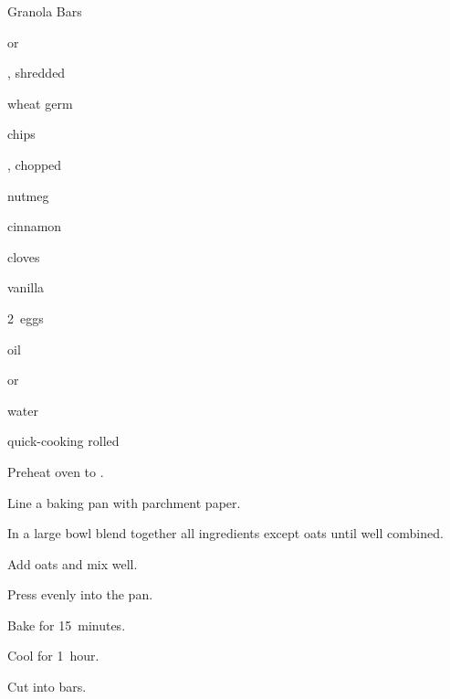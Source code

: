 \begin{recipe}{Granola Bars}{}{}

\begin{ingredients}
\item \C{\half}  or 
\item \C{\half} , shredded
\item \C{\quarter} wheat germ
\item \C{\quarter}  chips
\item \C{\quarter} , chopped
\item \tp{\half} nutmeg
\item \tp{\half} cinnamon
\item \tp{\half} cloves
\item \tp{\half} 
\item {} vanilla
\item 2~eggs
\item \C{\twothird} 
\item {} oil
\item {}  or 
\item \C{\half} water
\item {} quick-cooking rolled 
\end{ingredients}

\begin{directions}
\item Preheat oven to .
\item Line a  baking pan with parchment paper.
\item In a large bowl blend together all ingredients except oats until well combined.
\item Add oats and mix well.
\item Press evenly into the pan.
\item Bake for 15~minutes.
\item Cool for 1~hour.
\item Cut into bars.
\end{directions}

\end{recipe}
